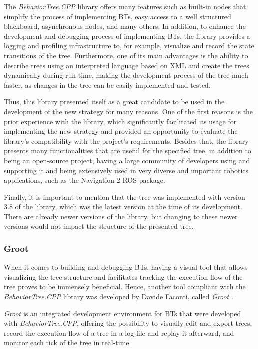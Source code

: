 The \textit{BehaviorTree.CPP} library offers many features such as built-in nodes that simplify the process of implementing BTs, easy access to a well structured blackboard, asynchronous nodes, and many others. In addition, to enhance the development and debugging process of implementing BTs, the library provides a logging and profiling infrastructure to, for example, visualize and record the state transitions of the tree. Furthermore, one of its main advantages is the ability to describe trees using an interpreted language based on XML and create the trees dynamically during run-time, making the development process of the tree much faster, as changes in the tree can be easily implemented and tested.

Thus, this library presented itself as a great candidate to be used in the development of the new strategy for many reasons. One of the first reasons is the prior experience with the library, which significantly facilitated its usage for implementing the new strategy and provided an opportunity to evaluate the library's compatibility with the project's requirements. Besides that, the library presents many functionalities that are useful for the specified tree, in addition to being an open-source project, having a large community of developers using and supporting it and being extensively used in very diverse and important robotics applications, such as the Navigation 2 \cite{nav2} ROS package.

Finally, it is important to mention that the tree was implemented with version 3.8 of the library, which was the latest version at the time of its development. There are already newer versions of the library, but changing to these newer versions would not impact the structure of the presented tree.

\subsubsection{Groot}
\label{subsubsec:groot}

When it comes to building and debugging BTs, having a visual tool that allows visualizing the tree structure and facilitates tracking the execution flow of the tree proves to be immensely beneficial. Hence, another tool compliant with the \textit{BehaviorTree.CPP} library was developed by Davide Faconti, called \textit{Groot} \cite{Groot}.

\textit{Groot} is an integrated development environment for BTs that were developed with \textit{BehaviorTree.CPP}, offering the possibility to visually edit and export trees, record the execution flow of a tree in a log file and replay it afterward, and monitor each tick of the tree in real-time.

